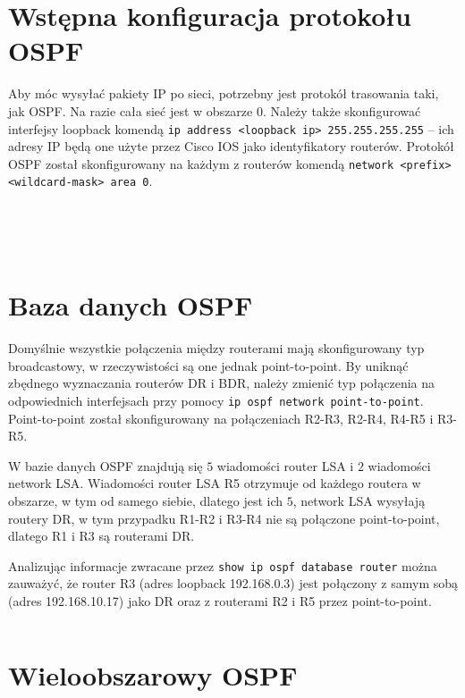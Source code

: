 \documentclass[a4paper,12pt,notitlepage]{article}
\begin{document}
\section{Wstępna konfiguracja protokołu OSPF}

Aby móc wysyłać pakiety IP po sieci, potrzebny jest protokół trasowania taki, jak OSPF. Na razie cała sieć jest w obszarze 0. Należy także skonfigurować interfejsy loopback komendą \texttt{ip address <loopback ip> 255.255.255.255} -- ich adresy IP będą one użyte przez Cisco IOS jako identyfikatory routerów. Protokół OSPF został skonfigurowany na każdym z routerów komendą \texttt{network <prefix> <wildcard-mask> area 0}.

\inputminted[label=Router R1, firstline=228, lastline=279]{text}{R1.txt}
\inputminted[label=Router R2, firstline=366, lastline=422]{text}{R2_1.txt}
\inputminted[label=Router R3, firstline=286, lastline=341]{text}{R3.txt}
\inputminted[label=Router R4, firstline=269, lastline=324]{text}{R4.txt}
\inputminted[label=Router R5, firstline=285, lastline=339]{text}{R5.txt}

\section{Baza danych OSPF}

Domyślnie wszystkie połączenia między routerami mają skonfigurowany typ broadcastowy, w rzeczywistości są one jednak point-to-point. By uniknąć zbędnego wyznaczania routerów DR i BDR, należy zmienić typ połączenia na odpowiednich interfejsach przy pomocy \texttt{ip ospf network point-to-point}. Point-to-point został skonfigurowany na połączeniach R2-R3, R2-R4, R4-R5 i R3-R5. 

W bazie danych OSPF znajdują się $5$ wiadomości router LSA i $2$ wiadomości network LSA. Wiadomości router LSA R5 otrzymuje od każdego routera w obszarze, w tym od samego siebie, dlatego jest ich $5$, network LSA wysyłają routery DR, w tym przypadku R1-R2 i R3-R4 nie są połączone point-to-point, dlatego R1 i R3 są routerami DR. 

Analizując informacje zwracane przez \texttt{show ip ospf database router} można zauważyć, że router R3 (adres loopback 192.168.0.3) jest połączony z samym sobą (adres 192.168.10.17) jako DR oraz z routerami R2 i R5 przez point-to-point.

\inputminted[label=Router R5, firstline=366, lastline=595]{text}{R5.txt}

\section{Wieloobszarowy OSPF}
\end{document}
